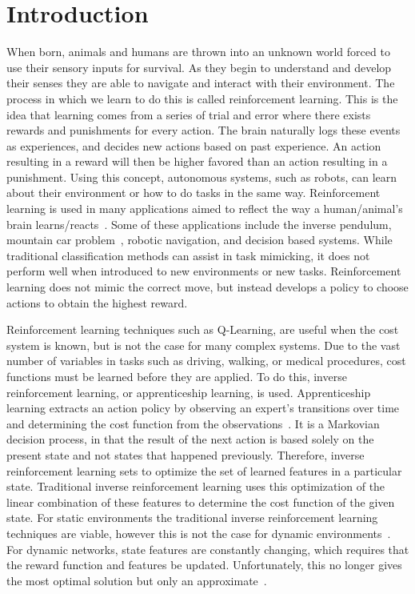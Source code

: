 \documentclass[12pt,american]{report}
\begin{document}
\chapter{Introduction}
When born, animals and humans are thrown into an unknown world forced to use their sensory inputs for survival. As they begin to understand and develop their senses they are able to  navigate  and  interact  with  their  environment.  The  process  in which  we  learn  to  do  this  is  called  reinforcement  learning.  This is  the  idea  that  learning  comes  from  a  series  of  trial  and  error where  there  exists  rewards  and  punishments  for  every  action. The brain naturally logs these events as experiences, and decides new  actions  based  on  past  experience. An  action  resulting  in  a reward  will  then  be  higher  favored  than  an  action  resulting  in a  punishment.  Using  this  concept,  autonomous  systems,  such  as robots, can learn about their environment or how to do tasks in the same way. Reinforcement learning is used in many applications aimed to reflect the way a human/animal's brain learns/reacts~\cite{atari}.  Some of these applications include the inverse pendulum, mountain car problem~\cite{sutton1996generalization}, robotic navigation, and decision based systems.  While traditional classification methods can assist in task mimicking, it does not perform well when introduced to new environments or new tasks.  Reinforcement learning does not mimic the correct move, but instead develops a policy to choose actions to obtain the highest reward.
		    
Reinforcement learning techniques such as Q-Learning, are useful when the cost system is known, but is not the case for many complex systems. Due to the vast number of variables in tasks such as driving, walking, or medical procedures, cost functions must be learned before they are applied.  To do this, inverse reinforcement learning, or apprenticeship learning, is used. Apprenticeship learning extracts an action policy by observing an expert's transitions over time and determining the cost function from the observations~\cite{ngoinverse}. It is a Markovian decision process, in that the result of the next action is based solely on the present state and not states that happened previously. Therefore, inverse reinforcement learning sets to optimize the set of learned features in a particular state. Traditional inverse reinforcement learning uses this optimization of the linear combination of these features to determine the cost function of the given state. For static environments the traditional inverse reinforcement learning techniques are viable, however this is not the case for dynamic environments~\cite{vasquez2014inverse}. For dynamic networks, state features are constantly changing, which requires that the reward function and features be updated.   Unfortunately, this no longer gives the most optimal solution but only an approximate~\cite{vasquez2014inverse}. 
		
\end{document}
